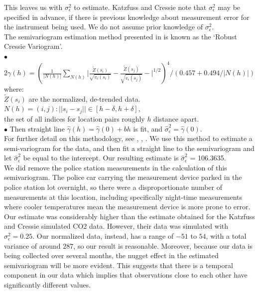 \documentclass[11pt]{article}
\newcommand{\myindent}{\hspace*{1cm}}
\begin{document}
This leaves us with $\sigma^2_\epsilon$ to estimate. Katzfuss and Cressie note that $\sigma^2_\epsilon$ may be specified in advance, if there is previous knowledge about measurement error for the instrument being used.  We do not assume prior knowledge of $\sigma^2_\epsilon$. \\

The semivariogram estimation method presented in \cite{Katzfuss} is known as the `Robust Cressie Variogram'.  \\

\myindent $\bullet$ $2\gamma(h) = \left( \frac{1}{|N(h)|} \sum_{N(h)} \biggr\rvert
\frac{\tilde{Z}(s_i)}{\sqrt{v_\epsilon (s_i)}} - 
\frac{\tilde{Z}(s_j)}{\sqrt{v_\epsilon (s_j)}} - 
\biggr\rvert^{1/2} \right)^4 / \left(0.457 + 0.494 / |N(h)|\right)$ \\

\myindent\myindent where: \\
\myindent \myindent  $\tilde{Z}(s_i)$ are the normalized, de-trended data. \\
\myindent \myindent $N(h) = {(i,j): ||s_i - s_j|| \in [h - \delta, h + \delta ] }$, \\
\myindent \myindent \myindent the set of all indices for location pairs roughly $h$ distance apart.\\

\myindent $\bullet$ Then straight line $\hat{\gamma}(h) = \hat{\gamma}(0) + bh$ is fit, and $\hat{\sigma}^2_\epsilon = \hat{\gamma}(0)$.\\

For further detail on this methodology, see \cite{CressieHawkins}, \cite{Cressievariogram}, \cite{Kangetal}. We use this method to estimate a semi-variogram for the data, and then fit a straight line to the semivariogram and let $\hat{\sigma}^2_\epsilon$ be equal to the intercept.  Our resulting estimate is $\hat{\sigma}^2_\epsilon$ = 106.3635. \\

We did remove the police station measurements in the calculation of this semivariogram.  The police car carrying the measurement device parked in the police station lot overnight, so there were a disproportionate number of measurements at this location, including specifically night-time measurements where cooler temperatures mean the measurement device is more prone to error. \\

Our estimate was considerably higher than the estimate obtained for the Katzfuss and Cressie simulated CO2 data.  However, their data was simulated with $\sigma^2_\epsilon = 0.25$. Our normalized data, instead, has a range of $-51$ to $54$, with a total variance of around $287$, so our result is reasonable. Moreover, because our data is being collected over several months, the nugget effect in the estimated semivariogram will be more evident. This suggests that there is a temporal component in our data which implies that observations close to each other have significantly different values.
\end{document}
